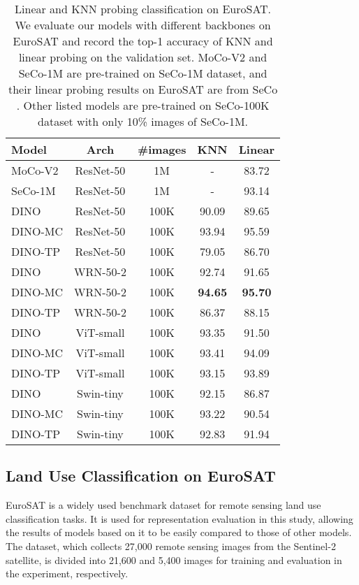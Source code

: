 \documentclass[10pt,twocolumn,letterpaper]{article}
\begin{document}
\begin{table}
  \centering
  \begin{tabular}{lcccc}
    \toprule
    Model & Arch & \#images & KNN & Linear \\
    \midrule
    MoCo-V2 & ResNet-50 & 1M & - & 83.72 \\
    SeCo-1M & ResNet-50 & 1M & - & 93.14 \\
    \midrule
    DINO & ResNet-50 & 100K & 90.09 & 89.65  \\
    DINO-MC & ResNet-50 & 100K & 93.94 & 95.59  \\
    DINO-TP & ResNet-50 & 100K & 79.05 & 86.70  \\
    \midrule
    DINO & WRN-50-2 & 100K & 92.74 & 91.65 \\
    DINO-MC & WRN-50-2 & 100K & \textbf{94.65} & \textbf{95.70} \\
    DINO-TP & WRN-50-2 & 100K & 86.37 & 88.15 \\
    \midrule
    DINO & ViT-small & 100K & 93.35 & 91.50 \\
    DINO-MC & ViT-small & 100K & 93.41 & 94.09 \\
    DINO-TP & ViT-small & 100K & 93.15 & 93.89 \\
    \midrule
    DINO & Swin-tiny & 100K & 92.15 & 86.87 \\
    DINO-MC & Swin-tiny & 100K & 93.22 & 90.54 \\
    DINO-TP & Swin-tiny & 100K & 92.83 & 91.94 \\
    \bottomrule
  \end{tabular}
  \caption{Linear and KNN probing classification on EuroSAT. 
  We evaluate our models with different backbones on EuroSAT and record the top-1 accuracy of KNN and linear probing on the validation set.
  MoCo-V2 \cite{chen2020improved} and SeCo-1M \cite{manas2021seasonal} are pre-trained on SeCo-1M dataset, and their linear probing results on EuroSAT are from SeCo \cite{manas2021seasonal}.
  Other listed models are pre-trained on SeCo-100K dataset with only 10\% images of SeCo-1M.
  }
  \label{table:DINO-Backbones}
\end{table}


\subsection{Land Use Classification on EuroSAT}
EuroSAT is a widely used benchmark dataset for remote sensing land use classification tasks.
It is used for representation evaluation in this study, allowing the results of models based on it to be easily compared to those of other models.
The dataset, which collects 27,000 remote sensing images from the Sentinel-2 satellite, is divided into 21,600 and 5,400 images for training and evaluation in the experiment, respectively.
\end{document}
